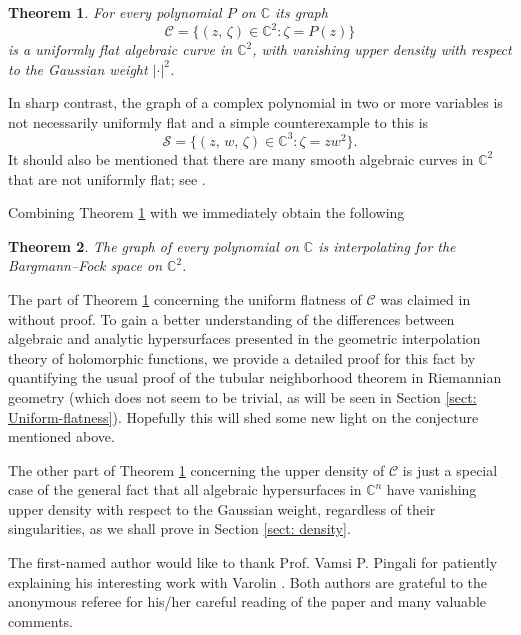 \documentclass[12pt,a4paper]{amsart}
\numberwithin{equation}{section}
\newtheorem{theorem}{Theorem}[section]
\theoremstyle{definition}
\begin{document}
\begin{theorem}\label{thm:Uniform-flatness}
For every polynomial $P$ on $\mathbb C$ its graph
   $$
   \mathcal{C}=\big\{(z,\, \zeta)\in \mathbb C^2 \!: \zeta=P(z) \big\}
   $$
is a uniformly flat algebraic curve in $\mathbb C^2$, with vanishing upper density with respect to the Gaussian weight $|\cdot|^2$.
\end{theorem}

In sharp contrast, the graph of a complex polynomial in two or more variables is not necessarily uniformly flat and a simple counterexample to this is
   $$
   \mathcal{S}=\big\{(z,\, w, \, \zeta)\in \mathbb C^3 \!: \zeta=zw^2 \big\}.
   $$
It should also be mentioned that there are many smooth algebraic curves in $\mathbb C^2$ that are not uniformly flat; see \cite{PV_Nagoya21}.




Combining Theorem \ref{thm:Uniform-flatness} with \cite[Theorem 1]{PV_Crelle16} we immediately obtain the following

\begin{theorem}\label{thm:interpolating}
The graph of every polynomial on $\mathbb C$ is interpolating for the Bargmann--Fock space on $\mathbb C^2$.
\end{theorem}


The part of Theorem \ref{thm:Uniform-flatness} concerning the uniform flatness of $\mathcal{C}$ was claimed in \cite[Remark 1.3]{PV_Nagoya21} without proof. To gain a better understanding of the differences between algebraic and analytic hypersurfaces presented in the geometric interpolation theory of holomorphic functions, we provide a detailed  proof for this fact by quantifying the usual proof of the tubular neighborhood theorem in Riemannian geometry (which does not seem to be trivial, as will be seen in Section \ref{sect: Uniform-flatness}). Hopefully this will shed some new light on the conjecture mentioned above.

The other part of Theorem \ref{thm:Uniform-flatness} concerning the upper density of $\mathcal{C}$ is just a special case of the general fact that all algebraic hypersurfaces in $\mathbb C^n$ have vanishing upper density with respect to the Gaussian weight, regardless of their singularities, as we shall prove in Section \ref{sect: density}.



\smallskip
{}
The first-named author would like to thank Prof. Vamsi P. Pingali for patiently explaining his interesting work with Varolin \cite{PV_Crelle16}. Both authors are grateful to the anonymous
referee  for his/her careful reading of the paper and many valuable comments.
\end{document}
